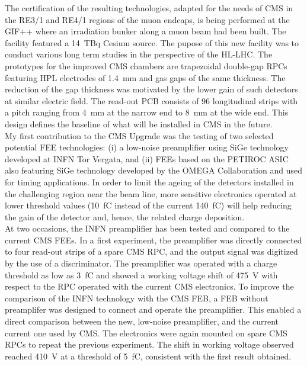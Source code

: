 	The certification of the resulting technologies, adapted for the needs of CMS in the RE3/1 and RE4/1 regions of the muon endcaps, is being performed at the \acf{GIF++} where an irradiation bunker along a muon beam had been built. The facility featured a \SI{14}{TBq} Cesium source. The pupose of this new facility was to conduct various long term studies in the perspective of the HL-LHC. The prototypes for the improved CMS chambers are trapezoidal double-gap RPCs featuring \acf{HPL} electrodes of \SI{1.4}{mm} and gas gaps of the same thickness. The reduction of the gap thickness was motivated by the lower gain of such detectors at similar electric field. The read-out PCB consists of 96 longitudinal strips with a pitch ranging from \SI{4}{mm} at the narrow end to \SI{8}{mm} at the wide end. This design defines the baseline of what will be installed in CMS in the future.\\
	My first contribution to the CMS Upgrade was the testing of two selected potential \acf{FEE} technologies: (i) a low-noise preamplifier using SiGe technology developed at INFN Tor Vergata, and (ii) FEEs based on the PETIROC ASIC also featuring SiGe technology developed by the OMEGA Collaboration and used for timing applications. In order to limit the ageing of the detectors installed in the challenging region near the beam line, more sensitive electronics operated at lower threshold values (\SI{10}{fC} instead of the current \SI{140}{fC}) will help reducing the gain of the detector and, hence, the related charge deposition.\\
	At two occasions, the INFN preamplifier has been tested and compared to the current CMS FEEs. In a first experiment, the preamplifier was directly connected to four read-out strips of a spare CMS RPC, and the output signal was digitized by the use of a discriminator. The preamplifier was operated with a charge threshold as low as \SI{3}{fC} and showed a working voltage shift of \SI{475}{V} with respect to the RPC operated with the current CMS electronics. To improve the comparison of the INFN technology with the CMS FEB, a FEB without preamplifer was designed to connect and operate the preamplifier. This enabled a direct comparison between the new, low-noise preamplifier, and the current current one used by CMS. The electronics were again mounted on spare CMS RPCs to repeat the previous experiment. The shift in working voltage observed reached \SI{410}{V} at a threshold of \SI{5}{fC}, consistent with the first result obtained.\\

